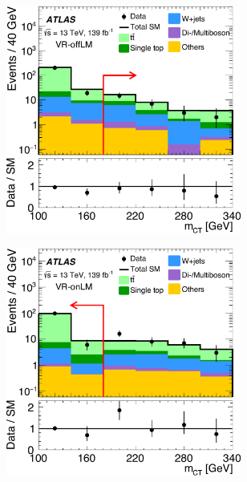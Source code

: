  \begin{figure}
	\centering
	\begin{subfigure}[b]{0.5\linewidth}
		\centering\includegraphics[width=0.85\textwidth]{OneLeptonbb_VR_UnderFlowBin_VRtt1offnomct2EM_mct2_yellow}
	\end{subfigure}\hfill
	\begin{subfigure}[b]{0.5\linewidth}
		\centering\includegraphics[width=0.85\textwidth]{OneLeptonbb_VR_UnderFlowBin_VRtt1onnomct2EM_mct2_yellow}
	\end{subfigure}\hfill
	\begin{subfigure}[b]{0.5\linewidth}

\end{subfigure}
\end{figure}
